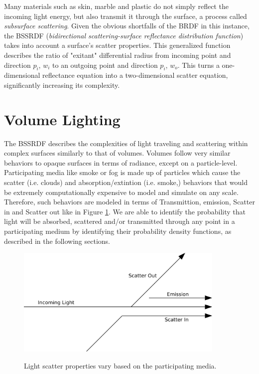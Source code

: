 \documentclass[12pt]{ucthesis}
\newcommand{\captionfonts}{\small\bf\ssp}
\begin{document}
Many materials such as skin, marble and plastic do not simply reflect the incoming light energy, but also transmit it through the surface, a process called \textit{subsurface scattering}.  Given the obvious shortfalls of the BRDF in this instance, the BSSRDF (\textit{bidirectional scattering-surface reflectance distribution function}) takes into account a surface's scatter properties.  This generalized function describes the ratio of "exitant" differential radius from incoming point and direction $\textit{p}_{i}$, $w_{i}$ to an outgoing point and direction $\textit{p}_{i}$, $w_{o}$.  This turns a one-dimensional reflectance equation into a two-dimensional scatter equation, significantly increasing its complexity.

\section{Volume Lighting}

The BSSRDF describes the complexities of light traveling and scattering within complex surfaces similarly to that of volumes.  Volumes follow very similar behaviors to opaque surfaces in terms of radiance, except on a particle-level.  Participating media like smoke or fog is made up of particles which cause the scatter (i.e. clouds) and absorption/extintion (i.e. smoke,) behaviors that would be extremely computationally expensive to model and simulate on any scale.  Therefore, such behaviors are modeled in terms of Transmittion, emission, Scatter in and Scatter out like in Figure \ref{fig:vol_scat}.  We are able to identify the probability that light will be absorbed, scattered and/or transmitted through any point in a participating medium by identifying their probability density functions, as described in the following sections. 
\begin{figure}[h!]
    \centering
    \includegraphics[width=100mm]{img/diag/vol_scatter.pdf}
    \captionfonts
    \caption{Light scatter properties vary based on the participating media.}
    \label{fig:vol_scat}
\end{figure}
\end{document}

